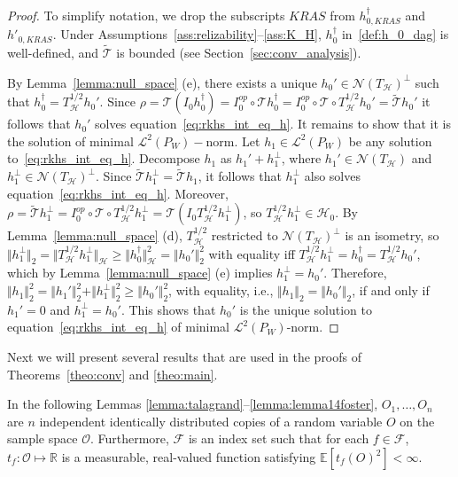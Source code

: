 \documentclass[twoside,11pt]{article}
\newcommand{\mc}{\mathcal}
\begin{document}
    \begin{proof} To simplify notation, we drop the subscripts $KRAS$ from $h_{0,KRAS}^\dag$ and $h'_{0,KRAS}$. Under Assumptions~\ref{ass:relizability}--\ref{ass:K_H}, $h_0^\dag$ in~\eqref{def:h_0_dag} is well-defined, and $\widetilde{\mc{T}}$ is bounded (see Section~\ref{sec:conv_analysis}). 

By Lemma~\ref{lemma:null_space} (e), there exists a unique $h_0'\in\mc{N}(T_\mc{H})^\perp$ such that $h_0^\dag=T_\mc{H}^{1/2}h_0'$. Since $\rho=\mc{T}\left(I_0h_0^\dag\right)=I_0^{op}\circ\mc{T}h_0^\dag=I_0^{op}\circ\mc{T}\circ T_\mc{H}^{1/2}h_0'=\widetilde{\mc{T}}h_0'$
it follows that $h_0'$ solves equation~\eqref{eq:rkhs_int_eq_h}. It remains to show that it is the solution of minimal $\mc{L}^2(P_{W})-$norm. Let $h_1\in\mc{L}^2(P_{W})$ be any solution to~\eqref{eq:rkhs_int_eq_h}. Decompose $h_1$ as $h_1'+h_1^\perp$, where $h_1'\in\mc{N}(T_\mc{H})$ and $h_1^\perp\in\mc{N}(T_\mc{H})^\perp$. Since $\widetilde{\mc{T}}h_1^\perp =\widetilde{\mc{T}}h_1$, it follows that $h_1^\perp$ also solves equation~\eqref{eq:rkhs_int_eq_h}. Moreover, $\rho=\widetilde{\mc{T}}h_1^\perp=I_0^{op}\circ\mc{T}\circ T_\mc{H}^{1/2}h_1^\perp =\mc{T}(I_0T_\mc{H}^{1/2}h_1^\perp)$, so $T_\mc{H}^{1/2}h_1^\perp\in\mc{H}_0$. By Lemma~\ref{lemma:null_space} (d), $T_\mc{H}^{1/2}$ restricted to $\mc{N}(T_\mc{H})^\perp$ is an isometry, so $\Vert h_1^\perp\Vert_2=\Vert T^{1/2}_\mc{H}h_1^\perp\Vert_\mc{H}\ge \Vert h_0^\dag\Vert_\mc{H}^2=\Vert h_0'\Vert_2^2$ with equality iff $T^{1/2}_{\mc{H}}h_1^\perp=h_0^\dag=T_\mc{H}^{1/2}h_0'$, which by Lemma~\ref{lemma:null_space} (e) implies $h_1^\perp=h_0'$. Therefore, $\Vert h_1\Vert_2^2=\Vert h_1'\Vert_2^2+\Vert h_1^\perp\Vert_2^2\ge \Vert h_0'\Vert_2^2$, with equality, i.e., $\Vert h_1\Vert_2=\Vert h_0'\Vert_2$, if and only if $h_1'=0$ and $h_1^\perp=h_0'$. This shows that $h_0'$ is the unique solution to equation~\eqref{eq:rkhs_int_eq_h} of minimal $\mc{L}^2(P_{W})$-norm.
\end{proof}

Next we will present several results that are used in the proofs of Theorems~\ref{theo:conv} and \ref{theo:main}.

In the following Lemmas \ref{lemma:talagrand}--\ref{lemma:lemma14foster}, $O_1,\dots,O_n$ are $n$ independent identically distributed copies of a random variable $O$ on the sample space $\mc{O}$. 
Furthermore, $\mc{F}$ is an index set such that for each $f \in \mc{F}$,  $t_f:\mc{O} \mapsto \mathbb{R}$ is a measurable, real-valued function satisfying $\mathbb{E}[t_f(O)^2]<\infty$. 
\end{document}
